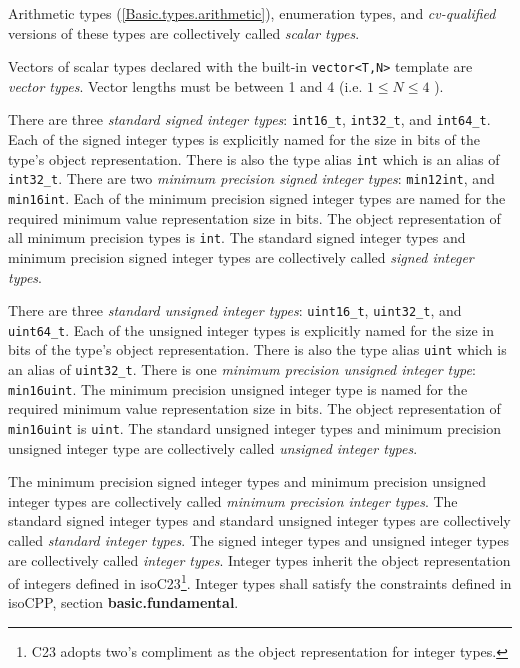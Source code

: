 \p Arithmetic types (\ref{Basic.types.arithmetic}), enumeration types, and
\textit{cv-qualified} versions of these types are collectively called
\textit{scalar types}.

\p Vectors of scalar types declared with the built-in \texttt{vector<T,N>}
template are \textit{vector types}. Vector lengths must be between 1 and 4 (i.e.
\( 1 \leq N \leq 4 \) ).


\p There are three \textit{standard signed integer types}: \texttt{int16\_t},
\texttt{int32\_t}, and \texttt{int64\_t}. Each of the signed integer types is
explicitly named for the size in bits of the type's object representation. There
is also the type alias \texttt{int} which is an alias of \texttt{int32\_t}.
There are two \textit{minimum precision signed integer types}:
\texttt{min12int}, and \texttt{min16int}. Each of the minimum precision signed
integer types are named for the required minimum value representation size in
bits. The object representation of all minimum precision types is \texttt{int}.
The standard signed integer types and minimum precision signed integer types are
collectively called \textit{signed integer types}.

\p There are three \textit{standard unsigned integer types}: \texttt{uint16\_t},
\texttt{uint32\_t}, and \texttt{uint64\_t}. Each of the unsigned integer types
is explicitly named for the size in bits of the type's object representation.
There is also the type alias \texttt{uint} which is an alias of
\texttt{uint32\_t}. There is one \textit{minimum precision unsigned integer
type}: \texttt{min16uint}. The minimum precision unsigned integer type is named
for the required minimum value representation size in bits. The object
representation of \texttt{min16uint} is \texttt{uint}. The standard unsigned
integer types and minimum precision unsigned integer type are collectively
called \textit{unsigned integer types}.

\p The minimum precision signed integer types and minimum precision unsigned
integer types are collectively called \textit{minimum precision integer types}.
The standard signed integer types and standard unsigned integer types are
collectively called \textit{standard integer types}. The signed integer types
and unsigned integer types are collectively called \textit{integer types}.
Integer types inherit the object representation of integers defined in
\glsdesc{isoC23}\footnote{C23 adopts two's compliment as the object
representation for integer types.}. Integer types shall satisfy the constraints
defined in \glsdesc{isoCPP}, section \textbf{basic.fundamental}.

